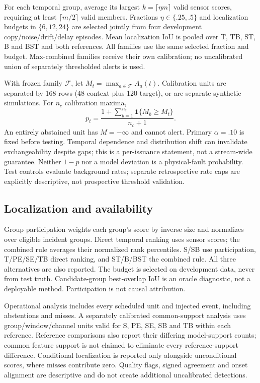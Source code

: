 \documentclass[conference]{IEEEtran}
\begin{document}
For each temporal group, average its largest $k=\lceil\eta m\rceil$ valid sensor
scores, requiring at least $\lceil m/2\rceil$ valid members. Fractions
$\eta\in\{.25,.5\}$ and localization budgets in $\{6,12,24\}$ are selected
jointly from four development copy/noise/drift/delay episodes. Mean localization
IoU is pooled over T, TB, ST, B and BST and both references. All families use
the same selected fraction and budget. Max-combined families receive their
own calibration; no uncalibrated union of separately thresholded alerts is used.

With frozen family $\mathcal F$, let $M_t=\max_{a\in\mathcal F}A_a(t)$.
Calibration units are separated by 168 rows (48 context plus 120 target), or
are separate synthetic simulations. For $n_c$ calibration maxima,
\begin{equation}
p_t=\frac{1+\sum_{b=1}^{n_c}\mathbf1\{M_b\geq M_t\}}{n_c+1}.
\label{eq:rank}
\end{equation}
An entirely abstained unit has $M=-\infty$ and cannot alert. Primary
$\alpha=.10$ is fixed before testing. Temporal dependence and distribution
shift can invalidate exchangeability despite gaps; this is a per-issuance
statement, not a stream-wide guarantee. Neither $1-p$ nor a model deviation
is a physical-fault probability. Test controls evaluate background rates;
separate retrospective rate caps are explicitly descriptive, not prospective
threshold validation.

\subsection{Localization and availability}
Group participation weights each group's score by inverse size and normalizes
over eligible incident groups. Direct temporal ranking uses sensor scores;
the combined rule averages their normalized rank percentiles. S/SB use
participation, T/PE/SE/TB direct ranking, and ST/B/BST the combined rule.
All three alternatives are also reported. The budget is selected on development
data, never from test truth. Candidate-group best-overlap IoU is an oracle
diagnostic, not a deployable method. Participation is not causal attribution.

Operational analysis includes every scheduled unit and injected event, including
abstentions and misses. A separately calibrated common-support analysis uses
group/window/channel units valid for S, PE, SE, SB and TB within each reference.
Reference comparisons also report their differing model-support counts; common
feature support is not claimed to eliminate every reference-support difference.
Conditional localization is reported only alongside unconditional scores, where
misses contribute zero. Quality flags, signed agreement and onset alignment
are descriptive and do not create additional uncalibrated detections.
\end{document}
